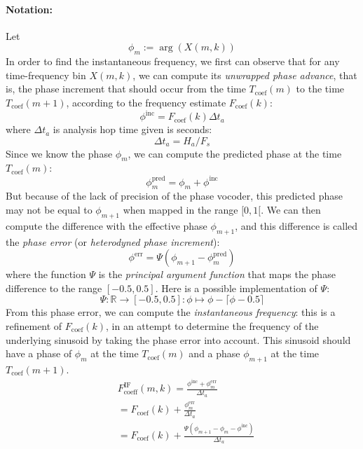 \documentclass[letterpaper]{article}
\begin{document}
\paragraph{Notation:}
Let \[\phi_m:=\arg(X(m,k))\]
In order to find the instantaneous frequency, we first can observe that for any
time-frequency bin \(X(m,k)\), we can compute its \emph{unwrapped phase
advance}, that is, the phase increment that should occur from the time
\(T_{\text{coef}}(m)\) to the time \(T_{\text{coef}}(m+1)\), according to the
frequency estimate \(F_{\text{coef}}(k)\):
\begin{equation}
    \phi^{\text{inc}}=F_{\text{coef}}(k) \Delta t_a
\end{equation}
where \(\Delta t_a\) is analysis hop time given is seconds:
\begin{equation}
    \Delta t_a=H_a/F_s
\end{equation}
Since we know the phase \(\phi_m\), we can compute the predicted phase at
the time \(T_{\text{coef}}(m)\):
\begin{equation}
    \phi^{\text{pred}}_m=\phi_m + \phi^{\text{inc}}
\end{equation}
But because of the lack of precision of the phase vocoder, this predicted phase
may not be equal to \(\phi_{m+1}\) when mapped in the range \([0, 1[\).
We can then compute the difference with the effective phase \(\phi_{m+1}\), and
this difference is called the \emph{phase error} (or \emph{heterodyned phase
increment}):
\begin{equation}
    \phi^{\text{err}}=\Psi(\phi_{m+1} - \phi^{\text{pred}}_m)
\end{equation}
where the function \(\Psi\) is the \emph{principal argument function} that maps
the phase difference to the range \([-0.5, 0.5]\).
Here is a possible implementation of \(\Psi\):
\begin{equation}
    \Psi:\mathbb{R}\to[-0.5,0.5]:\phi\mapsto \phi - \lceil \phi-0.5 \rceil
\end{equation}
From this phase error, we can compute the \emph{instantaneous frequency}: this
is a refinement of \(F_{\text{coef}}(k)\), in an attempt to determine the
frequency of the underlying sinusoid by taking the phase error into account.
This sinusoid should have a phase of
\(\phi_m\) at the time \(T_{\text{coef}}(m)\) and a phase \(\phi_{m+1}\) at
the time \(T_{\text{coef}}(m+1)\).
\begin{align}
    &F_{\text{coeff}}^{\text{IF}}(m,k)=\frac{\phi^{\text{inc}} + \phi^{\text{err}}_m}{\Delta t_a}\\
    &=F_{\text{coef}}(k) + \frac{\phi^{\text{err}}_m}{\Delta t_a}\\
    &=F_{\text{coef}}(k) + \frac{\Psi(\phi_{m+1} - \phi_m - \phi^{\text{inc}})}{\Delta t_a}
\end{align}
\end{document}
